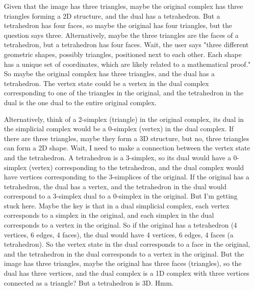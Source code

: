 Given that the image has three triangles, maybe the original complex has three triangles forming a 2D structure, and the dual has a tetrahedron. But a tetrahedron has four faces, so maybe the original has four triangles, but the question says three. Alternatively, maybe the three triangles are the faces of a tetrahedron, but a tetrahedron has four faces. Wait, the user says "three different geometric shapes, possibly triangles, positioned next to each other. Each shape has a unique set of coordinates, which are likely related to a mathematical proof." So maybe the original complex has three triangles, and the dual has a tetrahedron. The vertex state could be a vertex in the dual complex corresponding to one of the triangles in the original, and the tetrahedron in the dual is the one dual to the entire original complex. 

Alternatively, think of a 2-simplex (triangle) in the original complex, its dual in the simplicial complex would be a 0-simplex (vertex) in the dual complex. If there are three triangles, maybe they form a 3D structure, but no, three triangles can form a 2D shape. Wait, I need to make a connection between the vertex state and the tetrahedron. A tetrahedron is a 3-simplex, so its dual would have a 0-simplex (vertex) corresponding to the tetrahedron, and the dual complex would have vertices corresponding to the 3-simplices of the original. If the original has a tetrahedron, the dual has a vertex, and the tetrahedron in the dual would correspond to a 3-simplex dual to a 0-simplex in the original. But I'm getting stuck here. Maybe the key is that in a dual simplicial complex, each vertex corresponds to a simplex in the original, and each simplex in the dual corresponds to a vertex in the original. So if the original has a tetrahedron (4 vertices, 6 edges, 4 faces), the dual would have 4 vertices, 6 edges, 4 faces (a tetrahedron). So the vertex state in the dual corresponds to a face in the original, and the tetrahedron in the dual corresponds to a vertex in the original. But the image has three triangles, maybe the original has three faces (triangles), so the dual has three vertices, and the dual complex is a 1D complex with three vertices connected as a triangle? But a tetrahedron is 3D. Hmm. 

